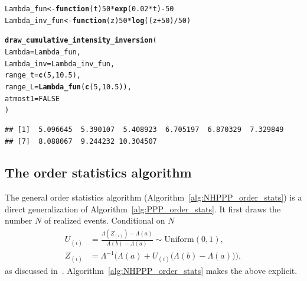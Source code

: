 \documentclass[article,nojss]{jss}\usepackage[]{graphicx}\usepackage[]{xcolor}
\makeatletter
\newcommand{\hlnum}[1]{\textcolor[rgb]{0.686,0.059,0.569}{#1}}%
\newcommand{\hlopt}[1]{\textcolor[rgb]{0,0,0}{#1}}%
\newcommand{\hlstd}[1]{\textcolor[rgb]{0.345,0.345,0.345}{#1}}%
\newcommand{\hlkwa}[1]{\textcolor[rgb]{0.161,0.373,0.58}{\textbf{#1}}}%
\newcommand{\hlkwb}[1]{\textcolor[rgb]{0.69,0.353,0.396}{#1}}%
\newcommand{\hlkwc}[1]{\textcolor[rgb]{0.333,0.667,0.333}{#1}}%
\newcommand{\hlkwd}[1]{\textcolor[rgb]{0.737,0.353,0.396}{\textbf{#1}}}%
\newenvironment{kframe}{%
 \def\at@end@of@kframe{}%
 \ifinner\ifhmode%
  \def\at@end@of@kframe{\end{minipage}}%
  \begin{minipage}{\columnwidth}%
 \fi\fi%
 \def\FrameCommand##1{\hskip\@totalleftmargin \hskip-\fboxsep
 \colorbox{shadecolor}{##1}\hskip-\fboxsep
     \hskip-\linewidth \hskip-\@totalleftmargin \hskip\columnwidth}%
 \MakeFramed {\advance\hsize-\width
   \@totalleftmargin\z@ \linewidth\hsize
   \@setminipage}}%
 {\par\unskip\endMakeFramed%
 \at@end@of@kframe}
\newenvironment{knitrout}{}{} %
\makeatother
\begin{document}
\begin{knitrout}
\color{fgcolor}\begin{kframe}
\begin{alltt}
\hlstd{Lambda_fun} \hlkwb{<-} \hlkwa{function}\hlstd{(}\hlkwc{t}\hlstd{)} \hlnum{50} \hlopt{*} \hlkwd{exp}\hlstd{(}\hlnum{0.02} \hlopt{*} \hlstd{t)} \hlopt{-} \hlnum{50}
\hlstd{Lambda_inv_fun} \hlkwb{<-} \hlkwa{function}\hlstd{(}\hlkwc{z}\hlstd{)} \hlnum{50} \hlopt{*} \hlkwd{log}\hlstd{((z} \hlopt{+} \hlnum{50}\hlstd{)} \hlopt{/} \hlnum{50}\hlstd{)}

\hlkwd{draw_cumulative_intensity_inversion}\hlstd{(}
  \hlkwc{Lambda} \hlstd{= Lambda_fun,}
  \hlkwc{Lambda_inv} \hlstd{= Lambda_inv_fun,}
  \hlkwc{range_t} \hlstd{=} \hlkwd{c}\hlstd{(}\hlnum{5}\hlstd{,} \hlnum{10.5}\hlstd{),}
  \hlkwc{range_L} \hlstd{=} \hlkwd{Lambda_fun}\hlstd{(}\hlkwd{c}\hlstd{(}\hlnum{5}\hlstd{,} \hlnum{10.5}\hlstd{)),}
  \hlkwc{atmost1} \hlstd{=} \hlnum{FALSE}
\hlstd{)}
\end{alltt}
\begin{verbatim}
## [1]  5.096645  5.390107  5.408923  6.705197  6.870329  7.329849
## [7]  8.088067  9.244232 10.304507
\end{verbatim}
\end{kframe}
\end{knitrout}



\subsection{The order statistics algorithm}\label{sec:order-stats}
The general order statistics algorithm (Algorithm~\ref{alg:NHPPP_order_stats}) is a direct generalization of Algorithm~\ref{alg:PPP_order_stats}. It first draws the number $N$ of realized events. Conditional on $N$
\begin{equation}\label{eq:nhppp_orderstats1}
\begin{aligned}
U_{(i)} &= \frac{\Lambda(Z_{(i)}) - \Lambda(a)}{\Lambda(b)- \Lambda(a)} \sim \textrm{Uniform}(0,1), \\
Z_{(i)} &= \Lambda^{-1} \Big ( \Lambda(a) + U_{(i)} \big( \Lambda(b)- \Lambda(a) \big) \Big),
\end{aligned}
\end{equation}
as discussed in~\citet{lewis1979thinning}. Algorithm~\ref{alg:NHPPP_order_stats} makes the above explicit.


\end{document}
